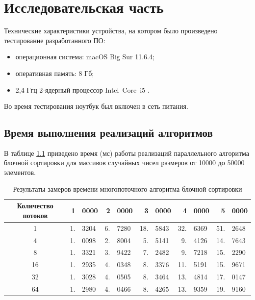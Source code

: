 \chapter{Исследовательская часть}

Технические характеристики устройства, на котором было произведено тестирование разработанного ПО: 

\begin{itemize}
	\item операционная система: macOS Big Sur 11.6.4;
	\item оперативная память: 8 Гб;
	\item 2,4 Ггц 2‑ядерный процессор Intel Core i5 \cite{intel}.
\end{itemize}

Во время тестирования ноутбук был включен в сеть питания.

\section{Время выполнения реализаций алгоритмов}

В таблице \ref{tab:time1} приведено время (мс) работы реализаций параллельного алгоритма блочной сортировки для массивов случайных чисел размеров от 10000 до 50000 элементов. 

\begin{table}[h]
	\begin{center}
		\caption{\label{tab:time1}Результаты замеров времени многопоточного алгоритма блочной сортировки}
		\begin{tabular}{|c|r@{}l|r@{}l|r@{}l|r@{}l|r@{}l|}
		\hline
		Количество потоков & 1&0000 &  2&0000  & 3&0000 & 4&0000 & 5&0000 \\
		\hline
		1  & 1.&3204 & 6.&7280 & 18.&5843 & 32.&6369 & 51.&2648 \\
		\hline
		4  & 1.&0098  & 2.&8004 & 5.&5141 &  9.&4126 & 14.&7643  \\
		\hline
		8  & 1.&3321 & 3.&9422 & 7.&2482 &  9.&7218 & 15.&2290 \\
		\hline
		16  & 1.&2935 & 4.&0348 & 8.&3376 & 11.&5191 & 15.&9671 \\
		\hline
		32  & 1.&3028 & 4.&0505 & 8.&3464 & 13.&4814 & 17.&0147 \\
		\hline
		64  & 1.&2980 & 4.&0466 & 8.&4265 & 13.&9359 & 19.&9160 \\
		\hline
		\end{tabular}
	\end{center}
\end{table}

